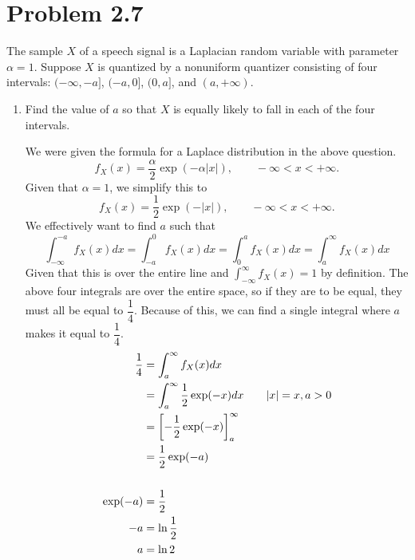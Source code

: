 \documentclass[11pt]{article}
\begin{document}
\section*{Problem 2.7}
The sample $X$ of a speech signal is a Laplacian random variable with parameter $\alpha = 1$. Suppose $X$ is quantized by a nonuniform quantizer consisting of four intervals:
$(-\infty, -a]$, $(-a, 0]$, $(0, a]$, and $(a, +\infty)$.

\begin{enumerate}[label=(\alph*)]
    \item Find the value of $a$ so that $X$ is equally likely to fall in each of the four intervals.
    \begin{solution}

        We were given the formula for a Laplace distribution in the above question.
        \[
            f_X(x) = \frac{\alpha}{2} \exp(-\alpha |x|), \qquad -\infty < x < +\infty.
        \]
        Given that $\alpha = 1$, we simplify this to
        \[
            f_X(x) = \frac{1}{2} \exp(-|x|), \qquad -\infty < x < +\infty.
        \]
        We effectively want to find $a$ such that
        \[
            \int_{-\infty}^{-a} f_X(x) dx = \int_{-a}^{0} f_X(x) dx = \int_{0}^{a} f_X(x) dx = \int_{a}^{\infty} f_X(x) dx
        \]
        Given that this is over the entire line and $\int_{-\infty}^{\infty} f_X(x) = 1$ by definition.
        The above four integrals are over the entire space, so if they are to be equal, they must all be equal to $\dfrac{1}{4}$.
        Because of this, we can find a single integral where $a$ makes it equal to $\dfrac{1}{4}$.
        \begin{align*}
            \dfrac{1}{4} &= \int_{a}^{\infty} f_X(x) dx \\
            &= \int_{a}^{\infty} \frac{1}{2} \exp(-x) dx \qquad \text{$|x| = x, a > 0$} \\
            &= \left[-\frac{1}{2} \exp(-x)\right]_{a}^{\infty} \\
            &= \frac{1}{2} \exp(-a) \\
            \vspace{4em} \\
            \exp(-a) &= \dfrac{1}{2} \\
            -a &= \ln{\dfrac{1}{2}} \\
            a &= \ln{2}
        \end{align*}
    \end{solution}

    \vspace{4em}


\end{enumerate}
\end{document}
